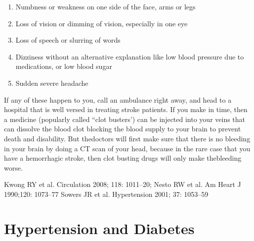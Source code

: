 \begin{enumerate}[•]
\itemsep=0pt
\item Numbness or weakness on one side of the face, arms or legs
\item Loss of vision or dimming of vision, especially in one eye
\item Loss of speech or slurring of words
\item Dizziness without an alternative explanation like low blood pressure due to medications, or low blood sugar
\item Sudden severe headache
\end{enumerate}

If any of these happen to you, call an ambulance right away, and head to a hospital that is well versed in treating stroke patients. If you make in time, then a medicine (popularly called “clot busters’) can be injected into your veins that can dissolve the blood clot blocking the blood supply to your brain to prevent death and disability. But the\break doctors will first make sure that there is no bleeding in your brain by doing a CT scan of your head, because in the rare case that you have a hemorrhagic stroke, then clot busting drugs will only make the\break bleeding worse.

\begin{thebibliography}{99}
 Kwong RY et al. Circulation 2008; 118: 1011–20; Nesto RW et al. Am Heart J 1990;120: 1073–77
 Sowers JR et al. Hypertension 2001; 37: 1053–59
\end{thebibliography}

\newpage
 
 \makeatletter
\def\@makechapterhead#1{%
  \vspace*{1\p@}%
  \vspace*{7\p@}%
  {\parindent \z@ \raggedleft \normalfont
    \ifnum \c@secnumdepth >\m@ne
      \if@mainmatter
        {\fontsize{19}{12}\selectfont\bfseries \@chapapp\space\thechapter  -A} %
        \vskip 4pt
        \hrule height 1pt 
        \par\nobreak
        \vskip 5\p@
      \fi
    \fi
    \interlinepenalty\@M
    \huge\bfseries #1\par\nobreak
    \vskip 6pt

        \hrule height 1pt 
    \vskip 20\p@
  }}
\makeatother
\chapter{Hypertension and Diabetes}\label{chap13A}

